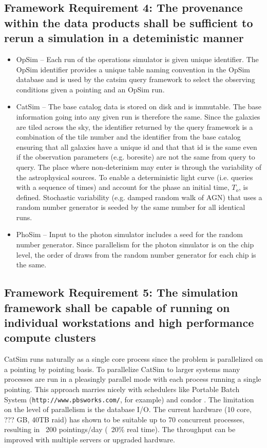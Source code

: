 \documentclass[]{article}
\begin{document}
{\subsection{Framework Requirement 4: The provenance within the data products shall be sufficient to rerun a simulation in a 
deteministic manner}
\begin{itemize}
\item OpSim -- Each run of the operations simulator is given unique identifier.  
The OpSim identifier provides a unique table naming convention in the OpSim database and is used by the catsim
query framework to select the observing conditions given a pointing and an OpSim run.
\item CatSim -- The base catalog data is stored on disk and is immutable. The base information
going into any given run is therefore the same.  Since the galaxies are tiled across the sky, the identifier returned
by the query framework is a combination of the tile number and the identifier from the base catalog ensuring that
all galaxies have a unique id and that that id is the same even if the observation parameters (e.g. boresite) are 
not the same from query to query.  The place where non-deterinism may enter is through the variability of the astrophysical
sources.
To enable a deterministic light curve (i.e. queries with a sequence of times) and account for the phase
an initial time, $T_o$, is defined.
Stochastic variability (e.g. damped random walk of AGN) that uses a random number generator is seeded by the same number for all identical runs.
\item PhoSim -- Input to the photon simulator includes a seed for the random number generator.  Since parallelism for
the photon simulator is on the chip level, the order of draws from the random number generator for each chip is the same.
\end{itemize}

\subsection{Framework Requirement 5: The simulation framework shall be capable of running on individual workstations 
and high performance compute clusters}
CatSim runs naturally as a single core process since the problem is parallelized on a pointing by pointing basis.
To parallelize CatSim to larger systems many processes are run in a pleasingly parallel mode with each process running
a single pointing.  This approach marries nicely with schedulers like Portable Batch System ({\tt http://www.pbsworks.com/}, for example) 
and condor \citep{condor}.  
The limitation on the level of parallelism 
is the database I/O.  The current hardware (10 core, ??? GB, 40TB raid) has shown to be suitable up to 70 concurrent processes, 
resulting in ~200 pointings/day (~20\% real time).  The throughput can be improved with multiple servers or upgraded hardware.

}
\end{document}
